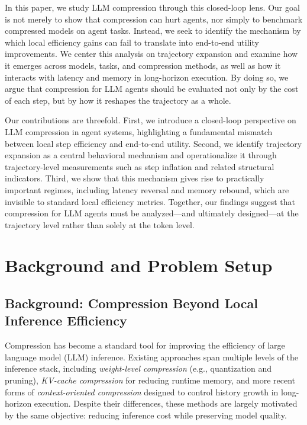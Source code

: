 \documentclass{article}
\begin{document}
In this paper, we study LLM compression through this closed-loop lens. Our goal is not merely to show that compression can hurt agents, nor simply to benchmark compressed models on agent tasks. Instead, we seek to identify the mechanism by which local efficiency gains can fail to translate into end-to-end utility improvements. We center this analysis on trajectory expansion and examine how it emerges across models, tasks, and compression methods, as well as how it interacts with latency and memory in long-horizon execution. By doing so, we argue that compression for LLM agents should be evaluated not only by the cost of each step, but by how it reshapes the trajectory as a whole.

Our contributions are threefold. First, we introduce a closed-loop perspective on LLM compression in agent systems, highlighting a fundamental mismatch between local step efficiency and end-to-end utility. Second, we identify trajectory expansion as a central behavioral mechanism and operationalize it through trajectory-level measurements such as step inflation and related structural indicators. Third, we show that this mechanism gives rise to practically important regimes, including latency reversal and memory rebound, which are invisible to standard local efficiency metrics. Together, our findings suggest that compression for LLM agents must be analyzed---and ultimately designed---at the trajectory level rather than solely at the token level.


\section{Background and Problem Setup}

\subsection{Background: Compression Beyond Local Inference Efficiency}

Compression has become a standard tool for improving the efficiency of large language model (LLM) inference. Existing approaches span multiple levels of the inference stack, including \emph{weight-level compression} (e.g., quantization and pruning), \emph{KV-cache compression} for reducing runtime memory, and more recent forms of \emph{context-oriented compression} designed to control history growth in long-horizon execution. Despite their differences, these methods are largely motivated by the same objective: reducing inference cost while preserving model quality.
\end{document}
